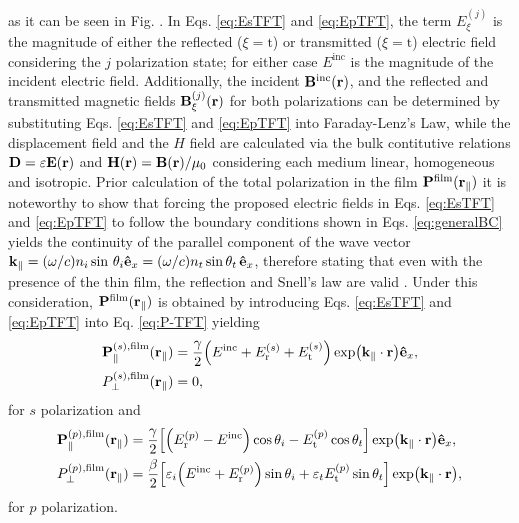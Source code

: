 %
as it can be seen in Fig. . In Eqs. \eqref{eq:EsTFT} and \eqref{eq:EpTFT}, the term $E_\xi^{(j)}$ is the magnitude of either the reflected ($\xi=\text{t}$) or transmitted ($\xi=\text{t}$) electric field considering the $j$ polarization state; for either case $E^\text{inc}$ is the magnitude of the incident electric field. Additionally, the incident $\vb{B}^\text{inc}(\vb{r})$, and the reflected and transmitted magnetic fields $\vb{B}_\xi^{(j)}(\vb{r})$ for both polarizations can be determined by substituting Eqs. \eqref{eq:EsTFT} and \eqref{eq:EpTFT} into Faraday-Lenz's Law, while the displacement field and the $H$ field are calculated via the bulk contitutive relations $\vb{D}=\varepsilon\vb{E}(\vb{r})$ and $\vb{H}(\vb{r})=\vb{B}(\vb{r})/\mu_0$ considering each medium linear, homogeneous and isotropic. Prior calculation of the total polarization in the film $\vb{P}^\text{film}(\vb{r}_\parallel)$ it is noteworthy to show that forcing the proposed electric fields in Eqs. \eqref{eq:EsTFT} and \eqref{eq:EpTFT} to follow the boundary conditions shown in Eqs. \eqref{eq:generalBC} yields the continuity of the parallel component of the wave vector $\vb{k}_\parallel = (\omega/c)n_i\sin\,\theta_i \vu{e}_x= (\omega/c)n_t\sin\theta_t\,\vu{e}_x$, therefore stating that even with the presence of the thin film, the reflection and Snell's law are valid \cite{lazzari_granfilm_2002,bedeaux_optical_2004}. Under this consideration, $\vb{P}^\text{film}(\vb{r}_\parallel)$ is obtained by introducing Eqs. \eqref{eq:EsTFT} and \eqref{eq:EpTFT} into Eq. \eqref{eq:P-TFT} yielding
%
\begin{subequations}%
\begin{align}
	\vb{P}^{(s),\text{film}}_\parallel(\vb{r}_\parallel) &=
				 \frac{\gamma}{2}\qty(E^\text{inc} + E_\text{r}^{(s)} + E_\text{t}^{(s)})\exp(\vb{k}_\parallel\cdot\vb{r}) \vu{e}_x,
	\\
	P_\perp^{(s),\text{film}}(\vb{r}_\parallel) &= 0,
\end{align}%
\label{eq:Pfilms}%
\end{subequations}%
%
for $s$ polarization and
%
\begin{subequations}%
\begin{align}
	\vb{P}^{(p),\text{film}}_\parallel(\vb{r}_\parallel) &= 
					\frac{\gamma}{2}\qty[
					\qty(E_\text{r}^{(p)}-E^\text{inc})\cos\theta_i
						-E_\text{t}^{(p)}\cos\theta_t
				] \exp(\vb{k}_\parallel\cdot\vb{r}) \vu{e}_x,
	\\
	P_\perp^{(p),\text{film}}(\vb{r}_\parallel)  &= \frac{\beta}{2}\qty[			
				\varepsilon_i\qty(E^\text{inc}+E_\text{r}^{(p)})\sin\theta_i 
				+ \varepsilon_t E_\text{t}^{(p)} \sin\theta_t ] \exp(\vb{k}_\parallel\cdot\vb{r}),
\end{align}%
\label{eq:Pfilmp}%
\end{subequations}%
%
for $p$ polarization.

